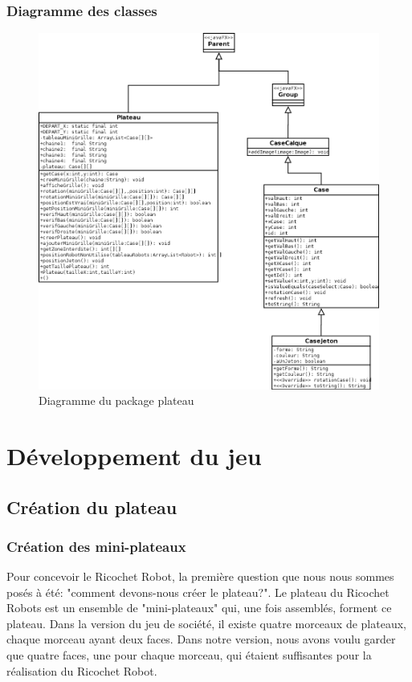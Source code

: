 \documentclass[a4paper, 12pt]{article}
\begin{document}
            \newpage
            
        \subsubsection{Diagramme des classes}
        
            \begin{figure}[H]
                \centering
                \includegraphics[scale=0.45]{images/diagrammePlateau.png}
                \caption{Diagramme du package plateau}
            \end{figure}
            
            

\section{Développement du jeu}
    \subsection{Création du plateau}
        \subsubsection{Création des mini-plateaux}
            Pour concevoir le Ricochet Robot, la première question que nous nous sommes posés à été: "comment devons-nous créer le plateau?". Le plateau du Ricochet Robots est un ensemble de "mini-plateaux" qui, une fois assemblés, forment ce plateau. Dans la version du jeu de société, il existe quatre morceaux de plateaux, chaque morceau ayant deux faces. Dans notre version, nous avons voulu garder que quatre faces, une pour chaque morceau, qui étaient suffisantes pour la réalisation du Ricochet Robot.
            
\end{document}
